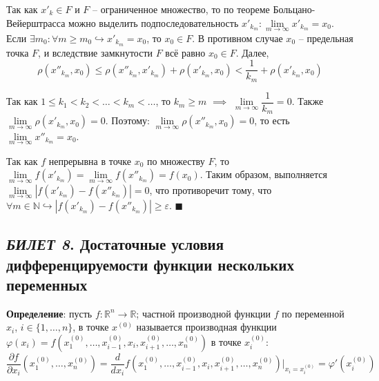 \documentclass[12pt, a4paper, reqno]{article}
\begin{document}
    Так как $x'_k \in F$ и $F$ -- ограниченное множество, то по теореме
    Больцано-Вейерштрасса можно выделить подпоследовательность $x'_{k_m}: \lim\limits_{m\to\infty}
    x'_{k_m} = x_0$. Если $\exists m_0: \forall m \geq m_0 \hookrightarrow x'_{k_m} = x_0$, то
    $x_0 \in F$. В противном случае $x_0$ -- предельная точка $F$, и вследствие замкнутости $F$
    всё равно $x_0 \in F$. Далее,
    \begin{equation*}
        \rho(x''_{k_m}, x_0) \leq \rho(x''_{k_m}, x'_{k_m}) + \rho(x'_{k_m}, x_0) <
        \frac{1}{k_m} + \rho(x'_{k_m}, x_0)
    \end{equation*}

    Так как $1\leq k_1 < k_2 < \ldots < k_m < \ldots$, то $k_m \geq m$ $\implies$ $\lim\limits_{m\to\infty}
    \dfrac{1}{k_m} = 0$. Также $\lim\limits_{m\to\infty} \rho(x'_{k_m}, x_0) = 0$. Поэтому:
    $\lim\limits_{m\to\infty} \rho(x''_{k_m}, x_0) = 0$, то есть
    $\lim\limits_{m\to\infty} x''_{k_m} = x_0$.

    Так как $f$ непрерывна в точке $x_0$ по множеству $F$, то $\lim\limits_{m\to\infty} f(x'_{k_m}) =
    \lim\limits_{m\to\infty} f(x''_{k_m}) = f(x_0)$. Таким образом, выполняется
    $\lim\limits_{m\to\infty} |f(x'_{k_m}) - f(x''_{k_m})| = 0$, что противоречит тому, что
    $\forall m\in\mathbb{N}\hookrightarrow |f(x'_{k_m}) - f(x''_{k_m})| \geq \varepsilon$.
    $\blacksquare$

\newpage
\subsection{\textit{БИЛЕТ 8}. Достаточные условия дифференцируемости функции нескольких переменных}

    \textbf{Определение}: пусть $f: \mathbb{R}^n \to \mathbb{R}$; частной производной функции $f$
    по переменной $x_i$, $i \in \{1, \ldots, n\}$, в точке $x^{(0)}$ называется производная функции
    $\varphi(x_i) = f(x_1^{(0)}, \ldots, x_{i - 1}^{(0)}, x_i, x_{i + 1}^{(0)}, \ldots, x_n^{(0)})$
    в точке $x_i^{(0)}$:
    \begin{equation*}
        \frac{\partial f}{\partial x_i}(x_1^{(0)}, \ldots, x_n^{(0)}) =
        \frac{d}{dx_i}f(x_1^{(0)}, \ldots, x_{i - 1}^{(0)},
                        x_i, x_{i + 1}^{(0)}, \ldots, x_n^{(0)})\Big|_{x_i = x_i^{(0)}} =
        \varphi'(x_i^{(0)})
    \end{equation*}
\end{document}
